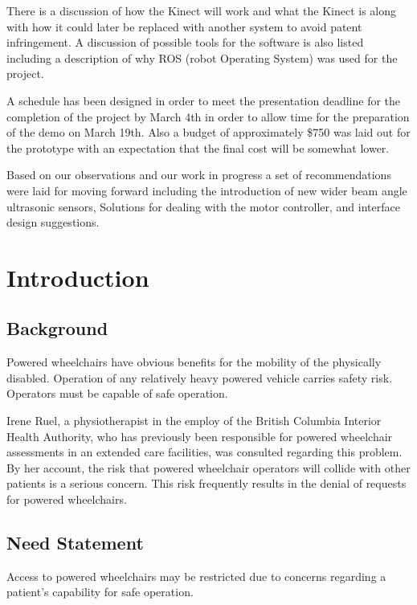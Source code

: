\documentclass[oneside,final,a4paper]{report}
\begin{document}
There is a discussion of how the Kinect will work and what the Kinect is along with how it could later be replaced with another system to avoid patent infringement. A discussion of possible tools for the software is also listed including a description of why ROS (robot Operating System) was used for the project.

A schedule has been designed in order to meet the presentation deadline for the completion of the project by March 4th in order to allow time for the preparation of the demo on March 19th. Also a budget of approximately \$750 was laid out for the prototype with an expectation that the final cost will be somewhat lower. 

Based on our observations and our work in progress a set of recommendations were laid for moving forward including the introduction of new wider beam angle ultrasonic sensors, Solutions for dealing with the motor controller, and interface design suggestions.


\clearpage
\setcounter{page}{1}
\pagestyle{headings}

\chapter{Introduction}

\section{Background}
Powered wheelchairs have obvious benefits for the mobility of the physically disabled.  Operation of any relatively heavy powered vehicle carries safety risk.  Operators must be capable of safe operation.

Irene Ruel, a physiotherapist in the employ of the British Columbia Interior Health Authority, who has previously been responsible for powered wheelchair assessments in an extended care facilities, was consulted regarding this problem.  By her account, the risk that powered wheelchair operators will collide with other patients is a serious concern.  This risk frequently results in the denial of requests for powered wheelchairs.

\section{Need Statement}
Access to powered wheelchairs may be restricted due to concerns regarding a patient's capability for safe operation.
\end{document}
